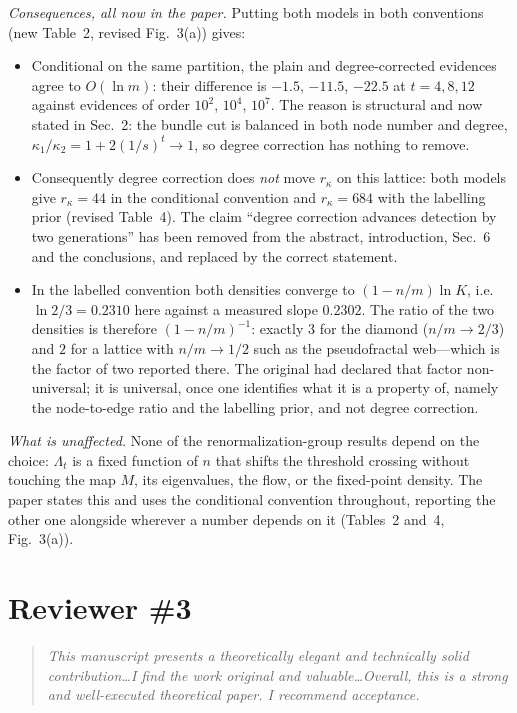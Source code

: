 \documentclass[11pt]{article}
\newcommand{\rk}{r_{\kappa}}
\newenvironment{point}{\begin{quote}\itshape}{\end{quote}}
\begin{document}
\emph{Consequences, all now in the paper.} Putting both models in both
conventions (new Table~2, revised Fig.~3(a)) gives:

\begin{itemize}
\item Conditional on the same partition, the plain and degree-corrected
      evidences agree to $O(\ln m)$: their difference is $-1.5$, $-11.5$,
      $-22.5$ at $t=4,8,12$ against evidences of order $10^2$, $10^4$, $10^7$.
      The reason is structural and now stated in Sec.~2: the bundle cut is
      balanced in both node number and degree,
      $\kappa_1/\kappa_2=1+2(1/s)^t\to1$, so degree correction has nothing to
      remove.
\item Consequently degree correction does \emph{not} move $\rk$ on this
      lattice: both models give $\rk=44$ in the conditional convention and
      $\rk=684$ with the labelling prior (revised Table~4). The claim
      ``degree correction advances detection by two generations'' has been
      removed from the abstract, introduction, Sec.~6 and the conclusions, and
      replaced by the correct statement.
\item In the labelled convention both densities converge to
      $(1-n/m)\ln K$, i.e.\ $\ln2/3=0.2310$ here against a measured slope
      $0.2302$. The ratio of the two densities is therefore $(1-n/m)^{-1}$:
      exactly $3$ for the diamond ($n/m\to2/3$) and $2$ for a lattice with
      $n/m\to1/2$ such as the pseudofractal web---which is the factor of two
      reported there. The original had declared that factor non-universal; it
      is universal, once one identifies what it is a property of, namely the
      node-to-edge ratio and the labelling prior, and not degree correction.
\end{itemize}

\emph{What is unaffected.} None of the renormalization-group results depend on
the choice: $\Lambda_t$ is a fixed function of $n$ that shifts the threshold
crossing without touching the map $M$, its eigenvalues, the flow, or the
fixed-point density. The paper states this and uses the conditional convention
throughout, reporting the other one alongside wherever a number depends on it
(Tables~2 and~4, Fig.~3(a)).

\section*{Reviewer \#3}

\begin{point}
This manuscript presents a theoretically elegant and technically solid
contribution\ldots I find the work original and valuable\ldots Overall, this is
a strong and well-executed theoretical paper. I recommend acceptance.
\end{point}
\end{document}
